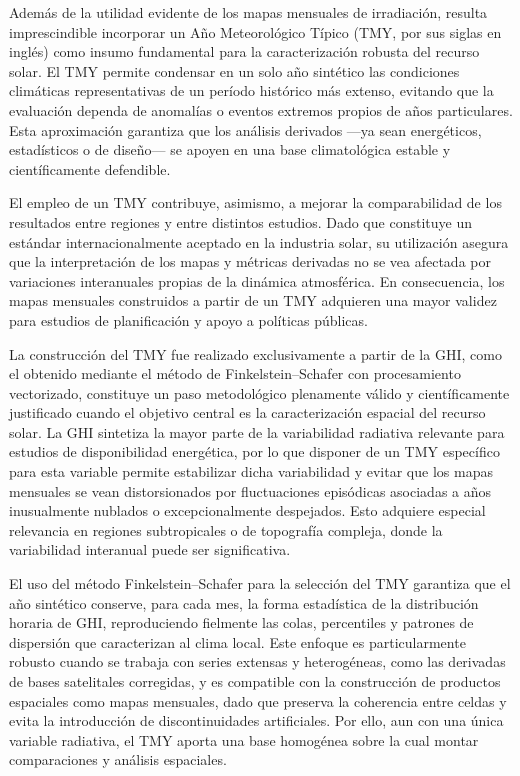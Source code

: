 \documentclass[letterpaper,12pt, twoside]{report}
\providecommand{\DIFdeltex}[1]{{\protect\color{red} \scriptsize #1}} %
\providecommand{\DIFdel}[1]{\texorpdfstring{\DIFdeltex{#1}}{}} %
\begin{document}
\DIFdel{Además de la utilidad evidente de los mapas mensuales de irradiación, resulta imprescindible incorporar un Año Meteorológico Típico (TMY, por sus siglas en inglés) como insumo fundamental para la caracterización robusta del recurso solar. El TMY permite condensar en un solo año sintético las condiciones climáticas representativas de un período histórico más extenso, evitando que la evaluación dependa de anomalías o eventos extremos propios de años particulares. Esta aproximación garantiza que los análisis derivados —ya sean energéticos, estadísticos o de diseño— se apoyen en una base climatológica estable y científicamente defendible.
}%

\DIFdel{El empleo de un TMY contribuye, asimismo, a mejorar la comparabilidad de los resultados entre regiones y entre distintos estudios. Dado que constituye un estándar internacionalmente aceptado en la industria solar, su utilización asegura que la interpretación de los mapas y métricas derivadas no se vea afectada por variaciones interanuales propias de la dinámica atmosférica. En consecuencia, los mapas mensuales construidos a partir de un TMY adquieren una mayor validez para estudios de planificación y apoyo a políticas públicas.
}%

\DIFdel{La construcción del TMY fue realizado exclusivamente a partir de la GHI, como el obtenido mediante el método de Finkelstein–Schafer con procesamiento vectorizado, constituye un paso metodológico plenamente válido y científicamente justificado cuando el objetivo central es la caracterización espacial del recurso solar. La GHI sintetiza la mayor parte de la variabilidad radiativa relevante para estudios de disponibilidad energética, por lo que disponer de un TMY específico para esta variable permite estabilizar dicha variabilidad y evitar que los mapas mensuales se vean distorsionados por fluctuaciones episódicas asociadas a años inusualmente nublados o excepcionalmente despejados. Esto adquiere especial relevancia en regiones subtropicales o de topografía compleja, donde la variabilidad interanual puede ser significativa.
}%

\DIFdel{El uso del método Finkelstein–Schafer para la selección del TMY garantiza que el año sintético conserve, para cada mes, la forma estadística de la distribución horaria de GHI, reproduciendo fielmente las colas, percentiles y patrones de dispersión que caracterizan al clima local. Este enfoque es particularmente robusto cuando se trabaja con series extensas y heterogéneas, como las derivadas de bases satelitales corregidas, y es compatible con la construcción de productos espaciales como mapas mensuales, dado que preserva la coherencia entre celdas y evita la introducción de discontinuidades artificiales. Por ello, aun con una única variable radiativa, el TMY aporta una base homogénea sobre la cual montar comparaciones y análisis espaciales.
}%
\end{document}
